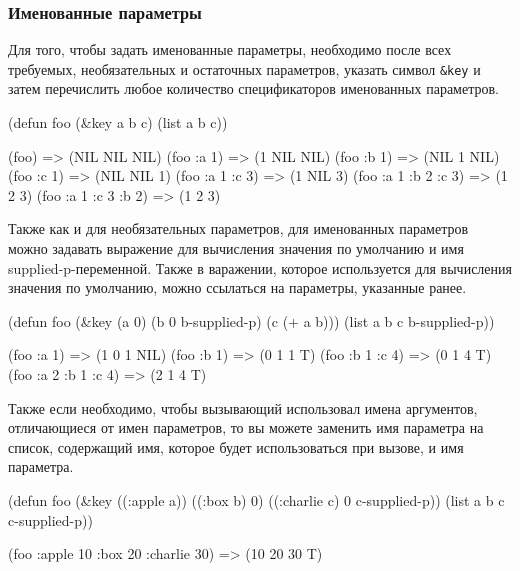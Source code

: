 \subsubsection{Именованные параметры}
Для того, чтобы задать именованные параметры, необходимо после всех требуемых, необязательных и остаточных параметров, указать символ \lstinline{&key} и затем перечислить любое количество спецификаторов именованных параметров.
\begin{cllst}{}{}
(defun foo (&key a b c) 
  (list a b c))

(foo)                => (NIL NIL NIL)
(foo :a 1)           => (1 NIL NIL)
(foo :b 1)           => (NIL 1 NIL)
(foo :c 1)           => (NIL NIL 1)
(foo :a 1 :c 3)      => (1 NIL 3)
(foo :a 1 :b 2 :c 3) => (1 2 3)
(foo :a 1 :c 3 :b 2) => (1 2 3)
\end{cllst}

Также как и для необязательных параметров, для именованных параметров можно задавать выражение для вычисления значения по умолчанию и имя supplied-p-переменной. Также в варажении, которое используется для вычисления значения по умолчанию, можно ссылаться на параметры, указанные ранее.
\begin{cllst}{}{}
(defun foo (&key (a 0) (b 0 b-supplied-p) (c (+ a b)))
  (list a b c b-supplied-p))

(foo :a 1)           => (1 0 1 NIL)
(foo :b 1)           => (0 1 1 T)
(foo :b 1 :c 4)      => (0 1 4 T)
(foo :a 2 :b 1 :c 4) => (2 1 4 T)
\end{cllst}

Также если необходимо, чтобы вызывающий использовал имена аргументов, отличающиеся от имен параметров, то вы можете заменить имя параметра на список, содержащий имя, которое будет использоваться при вызове, и имя параметра.
\begin{cllst}{}{}
(defun foo (&key ((:apple a)) ((:box b) 0) ((:charlie c) 0 c-supplied-p))
  (list a b c c-supplied-p))

(foo :apple 10 :box 20 :charlie 30) => (10 20 30 T)
\end{cllst}

